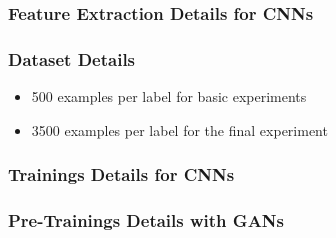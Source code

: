 \begin{frame}
  \frametitle{Feature Extraction Details for CNNs}
  
\end{frame}

\begin{frame}
  \frametitle{Dataset Details}
  \begin{itemize}
    \item 500 examples per label for basic experiments
    \item 3500 examples per label for the final experiment
  \end{itemize}
  
\end{frame}

\begin{frame}
  \frametitle{Trainings Details for CNNs}
  
\end{frame}

\begin{frame}
  \frametitle{Pre-Trainings Details with GANs}
  
\end{frame}

